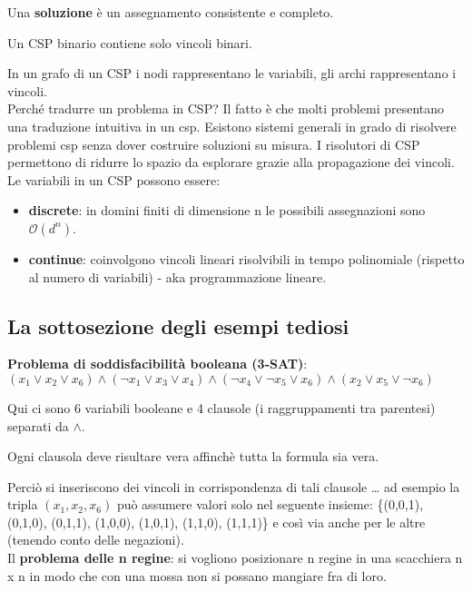 Una \textbf{soluzione} è un assegnamento consistente e completo.

Un CSP binario contiene solo vincoli binari.

In un grafo di un CSP i nodi rappresentano le variabili, gli archi rappresentano
i vincoli.\\

Perché tradurre un problema in CSP? Il fatto è che molti problemi presentano
una traduzione intuitiva in un csp. Esistono sistemi generali in grado di
risolvere problemi csp senza dover costruire soluzioni su misura.
I risolutori di CSP permettono di ridurre lo spazio da esplorare grazie
alla propagazione dei vincoli.\\

Le variabili in un CSP possono essere:

\begin{itemize}
 \item \textbf{discrete}: in domini finiti di dimensione n le possibili
assegnazioni sono $\mathcal{O}(d^n)$.
 \item \textbf{continue}: coinvolgono vincoli lineari risolvibili in tempo
polinomiale (rispetto al numero di variabili) - aka programmazione lineare.
\end{itemize}

\subsection{La sottosezione degli esempi tediosi}

\textbf{Problema di soddisfacibilità booleana (3-SAT)}:\\

$(x_1 \lor x_2 \lor x_6) \land (\neg x_1 \lor x_3 \lor x_4) \land
(\neg x_4 \lor \neg x_5 \lor x_6) \land (x_2 \lor x_5 \lor \neg x_6)$

Qui ci sono 6 variabili booleane e 4 clausole (i raggruppamenti tra parentesi)
separati da $\land$.

Ogni clausola deve risultare vera affinchè tutta la formula sia
vera.

Perciò si inseriscono dei vincoli in corrispondenza di tali clausole \dots
ad esempio la tripla $(x_1, x_2, x_6)$ può assumere valori solo nel seguente
insieme: \{(0,0,1), (0,1,0), (0,1,1), (1,0,0), (1,0,1), (1,1,0), (1,1,1)\} e
così via anche per le altre (tenendo conto delle negazioni).\\

Il \textbf{problema delle n regine}: si vogliono posizionare n regine in
una scacchiera n x n in modo che con una mossa non si possano mangiare
fra di loro.\\

